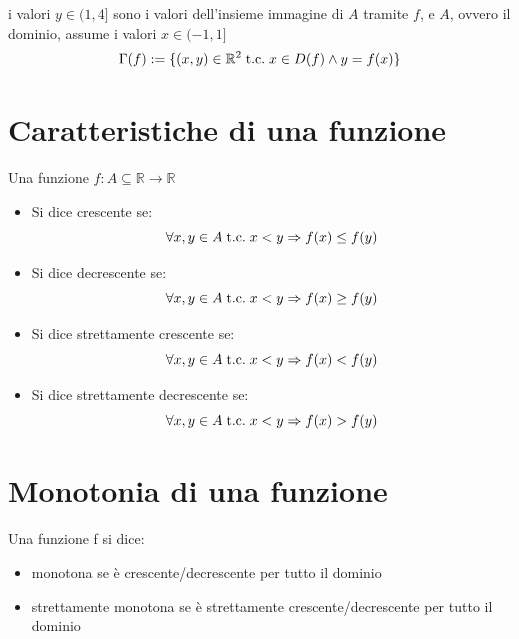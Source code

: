 \documentclass[a4paper, 12pt, openany]{book}
\begin{document}
	 \begin{center}
	 \end{center}
	 i valori $y \in (1, 4]$ sono i valori dell'insieme immagine di $A$ tramite $f$, e $A$, ovvero il dominio, assume i valori $x \in (-1, 1]$
	 \[\Gamma(f) := \{(x,y) \in \mathbb{R}^2 \;\text{t.c.}\; x \in D(f) \wedge y = f(x)\}\]
	 
	 \section{Caratteristiche di una funzione}
	 Una funzione $f: A \subseteq \mathbb{R} \longrightarrow \mathbb{R}$
	 
	 \begin{itemize}
	 	\item Si dice crescente se:
	 	\[\forall x,y \in A \;\text{t.c.}\; x < y \Rightarrow f(x) \leq f(y)\]
	 	\item Si dice decrescente se:
	 	\[\forall x,y \in A \;\text{t.c.}\; x < y \Rightarrow f(x) \geq f(y)\]
	 	\item Si dice strettamente crescente se:
	 	\[\forall x,y \in A \;\text{t.c.}\; x < y \Rightarrow f(x) < f(y)\]
	 	\item Si dice strettamente decrescente se:
	 	\[\forall x,y \in A \;\text{t.c.}\; x < y \Rightarrow f(x) > f(y)\]
	 \end{itemize}
	 
	 \section{Monotonia di una funzione}
	 Una funzione f si dice:
	 \begin{itemize}
	 	\item monotona se è crescente/decrescente per tutto il dominio
	 	\item strettamente monotona se è strettamente crescente/decrescente per tutto il dominio
	 \end{itemize}
	 
\end{document}
